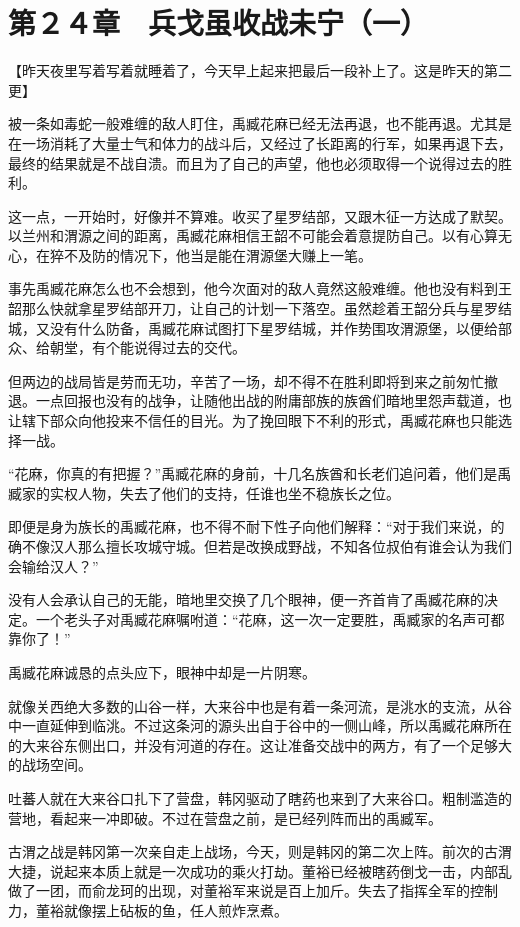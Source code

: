 \section{第２４章　兵戈虽收战未宁（一）}

【昨天夜里写着写着就睡着了，今天早上起来把最后一段补上了。这是昨天的第二更】

被一条如毒蛇一般难缠的敌人盯住，禹臧花麻已经无法再退，也不能再退。尤其是在一场消耗了大量士气和体力的战斗后，又经过了长距离的行军，如果再退下去，最终的结果就是不战自溃。而且为了自己的声望，他也必须取得一个说得过去的胜利。

这一点，一开始时，好像并不算难。收买了星罗结部，又跟木征一方达成了默契。以兰州和渭源之间的距离，禹臧花麻相信王韶不可能会着意提防自己。以有心算无心，在猝不及防的情况下，他当是能在渭源堡大赚上一笔。

事先禹臧花麻怎么也不会想到，他今次面对的敌人竟然这般难缠。他也没有料到王韶那么快就拿星罗结部开刀，让自己的计划一下落空。虽然趁着王韶分兵与星罗结城，又没有什么防备，禹臧花麻试图打下星罗结城，并作势围攻渭源堡，以便给部众、给朝堂，有个能说得过去的交代。

但两边的战局皆是劳而无功，辛苦了一场，却不得不在胜利即将到来之前匆忙撤退。一点回报也没有的战争，让随他出战的附庸部族的族酋们暗地里怨声载道，也让辖下部众向他投来不信任的目光。为了挽回眼下不利的形式，禹臧花麻也只能选择一战。

“花麻，你真的有把握？”禹臧花麻的身前，十几名族酋和长老们追问着，他们是禹臧家的实权人物，失去了他们的支持，任谁也坐不稳族长之位。

即便是身为族长的禹臧花麻，也不得不耐下性子向他们解释：“对于我们来说，的确不像汉人那么擅长攻城守城。但若是改换成野战，不知各位叔伯有谁会认为我们会输给汉人？”

没有人会承认自己的无能，暗地里交换了几个眼神，便一齐首肯了禹臧花麻的决定。一个老头子对禹臧花麻嘱咐道：“花麻，这一次一定要胜，禹臧家的名声可都靠你了！”

禹臧花麻诚恳的点头应下，眼神中却是一片阴寒。

就像关西绝大多数的山谷一样，大来谷中也是有着一条河流，是洮水的支流，从谷中一直延伸到临洮。不过这条河的源头出自于谷中的一侧山峰，所以禹臧花麻所在的大来谷东侧出口，并没有河道的存在。这让准备交战中的两方，有了一个足够大的战场空间。

吐蕃人就在大来谷口扎下了营盘，韩冈驱动了瞎药也来到了大来谷口。粗制滥造的营地，看起来一冲即破。不过在营盘之前，是已经列阵而出的禹臧军。

古渭之战是韩冈第一次亲自走上战场，今天，则是韩冈的第二次上阵。前次的古渭大捷，说起来本质上就是一次成功的乘火打劫。董裕已经被瞎药倒戈一击，内部乱做了一团，而俞龙珂的出现，对董裕军来说是百上加斤。失去了指挥全军的控制力，董裕就像摆上砧板的鱼，任人煎炸烹煮。

